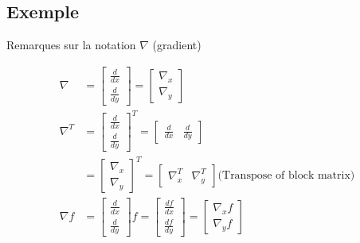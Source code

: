 \subsection{Exemple}

\frame{
    \tableofcontents[ 
        currentsubsection, 
    ]
}

\begin{frame}{Remarques sur la notation $\nabla$ (gradient)}


\begin{align*}
\nabla 
&= \begin{bmatrix} \frac{d}{dx} \\ \frac{d}{dy} \end{bmatrix}
= \begin{bmatrix} \nabla_{x} \\ \nabla_{y} \end{bmatrix} \\
\nabla^{T}
&= \begin{bmatrix} \frac{d}{dx} \\ \frac{d}{dy} \end{bmatrix}^{T}
= \begin{bmatrix} \frac{d}{dx} & \frac{d}{dy} \end{bmatrix} \\
&= \begin{bmatrix} \nabla_{x} \\ \nabla_{y} \end{bmatrix}^{T}
= \begin{bmatrix} \nabla_{x}^{T} & \nabla_{y}^{T} \end{bmatrix} 
\text{(Transpose of block matrix)} \\
\nabla f 
&= \begin{bmatrix} \frac{d}{dx} \\ \frac{d}{dy} \end{bmatrix} f 
= \begin{bmatrix} \frac{df}{dx} \\ \frac{df}{dy} \end{bmatrix}
= \begin{bmatrix} \nabla_{x}f \\ \nabla_{y}f \end{bmatrix}
\end{align*}


\end{frame}

